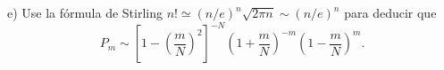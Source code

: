 e) Use la fórmula de Stirling $n ! \simeq(n / e)^n \sqrt{2 \pi n} \sim(n / e)^n$ para deducir que
$$
P_m \sim\left[1-\left(\frac{m}{N}\right)^2\right]^{-N}\left(1+\frac{m}{N}\right)^{-m}\left(1-\frac{m}{N}\right)^m .
$$

